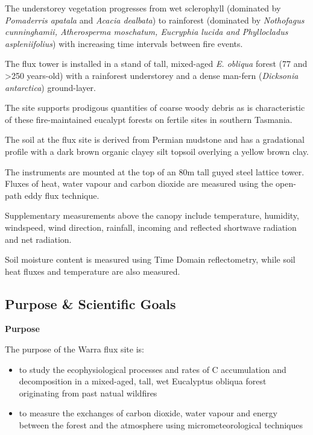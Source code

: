 \documentclass[11pt,a4paper]{article}
\begin{document}
The understorey vegetation progresses from wet sclerophyll  (dominated by \textit{Pomaderris apatala} and \textit{Acacia dealbata}) to rainforest  (dominated by \textit{Nothofagus cunninghamii,  Atherosperma moschatum, Eucryphia lucida and Phyllocladus aspleniifolius})  with increasing time intervals between fire events.

The flux tower is installed  in a stand of tall, mixed-aged \textit{E. obliqua} forest (77 and >250 years-old) with a rainforest understorey and a dense  man-fern (\textit{Dicksonia antarctica})  ground-layer.

The site supports prodigous quantities of coarse woody debris as  is characteristic of these fire-maintained eucalypt forests on fertile sites in  southern Tasmania.

The soil  at the flux site is derived from Permian mudstone and has a gradational profile  with a dark brown organic clayey silt topsoil overlying a yellow brown clay.

The  instruments are mounted at the top of an 80m tall guyed steel lattice tower.  Fluxes of heat, water vapour and carbon dioxide are measured using the  open-path eddy flux technique.

Supplementary measurements above the canopy  include temperature, humidity, windspeed, wind direction, rainfall, incoming  and reflected shortwave radiation and net radiation.

Soil moisture content is  measured using Time Domain reflectometry, while soil heat fluxes and  temperature are also measured.

\subsection*{Purpose \& Scientific Goals}

\textbf{Purpose}

The  purpose of the Warra flux site is:

\begin{itemize}
  \item to study the ecophysiological       processes and rates of C accumulation and decomposition in a mixed-aged,       tall, wet Eucalyptus obliqua forest       originating from past natual wildfires
\end{itemize}

\begin{itemize}
  \item to measure the exchanges of       carbon dioxide, water vapour and energy between the forest and the       atmosphere using micrometeorological techniques
\end{itemize}
\end{document}
